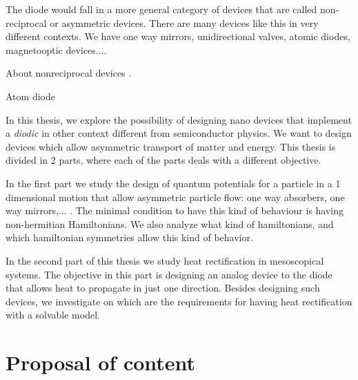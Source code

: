 The diode would fall in a more general category of devices that are called non-reciprocal or asymmetric devices. There are many devices like this in very different contexts. We have one way mirrors, unidirectional valves, atomic diodes, magnetooptic devices....


About nonreciprocal devices \cite{Deak2012}.

Atom diode \cite{Raizen2005,Ruschhaupt2004}

In this thesis, we explore the possibility of designing nano devices that implement a \textit{diodic} in other context different from semiconductor physics. We want to design devices which allow asymmetric transport of matter and energy. This thesis is divided in 2 parts, where each of the parts deals with a different objective.

In the first part we study the design of quantum potentials for a particle in a 1 dimensional motion that allow asymmetric particle flow: one way absorbers, one way mirrors,... . The minimal condition to have this kind of behaviour is having non-hermitian Hamiltonians. We also analyze what kind of hamiltonians, and which hamiltonian symmetries allow this kind of behavior.

In the second part of this thesis we study heat rectification in mesoscopical systems. The objective in this part is designing an analog device to the diode that allows heat to propagate in just one direction. Besides designing such devices, we investigate on which are the requirements for having heat rectification with a solvable model.




\section{Proposal of content}

